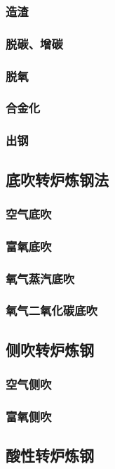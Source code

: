 \documentclass[UTF8]{../../ApplicationUniverse}
\begin{document}
        \subsubsection{造渣}
        \subsubsection{脱碳、增碳}
        \subsubsection{脱氧}
        \subsubsection{合金化}
        \subsubsection{出钢}
    \subsection{底吹转炉炼钢法}
        \subsubsection{空气底吹}
        \subsubsection{富氧底吹}
        \subsubsection{氧气蒸汽底吹}
        \subsubsection{氧气二氧化碳底吹}
    \subsection{侧吹转炉炼钢}
        \subsubsection{空气侧吹}
        \subsubsection{富氧侧吹}
    \subsection{酸性转炉炼钢}
\end{document}
